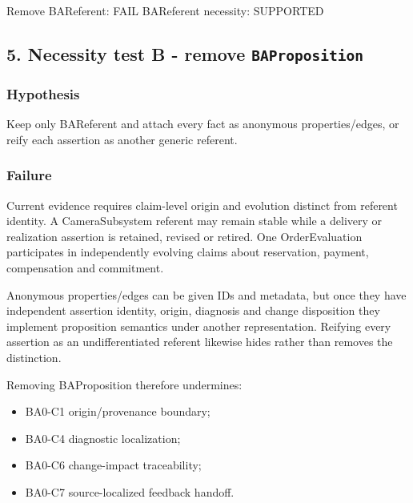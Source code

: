 \documentclass[
  10pt,
  a4paper,
]{article}
\newenvironment{Shaded}{}{}
\newcommand{\NormalTok}[1]{#1}
\providecommand{\tightlist}{%
  \setlength{\itemsep}{0pt}\setlength{\parskip}{0pt}}
\begin{document}
\begin{Shaded}
\begin{Highlighting}[]
\NormalTok{Remove BAReferent: FAIL}
\NormalTok{BAReferent necessity: SUPPORTED}
\end{Highlighting}
\end{Shaded}

\subsection{\texorpdfstring{5. Necessity test B - remove
\texttt{BAProposition}}{5. Necessity test B - remove BAProposition}}\label{necessity-test-b---remove-baproposition}

\subsubsection{Hypothesis}\label{hypothesis-1}

Keep only BAReferent and attach every fact as anonymous
properties/edges, or reify each assertion as another generic referent.

\subsubsection{Failure}\label{failure-1}

Current evidence requires claim-level origin and evolution distinct from
referent identity. A CameraSubsystem referent may remain stable while a
delivery or realization assertion is retained, revised or retired. One
OrderEvaluation participates in independently evolving claims about
reservation, payment, compensation and commitment.

Anonymous properties/edges can be given IDs and metadata, but once they
have independent assertion identity, origin, diagnosis and change
disposition they implement proposition semantics under another
representation. Reifying every assertion as an undifferentiated referent
likewise hides rather than removes the distinction.

Removing BAProposition therefore undermines:

\begin{itemize}
\tightlist
\item
  BA0-C1 origin/provenance boundary;
\item
  BA0-C4 diagnostic localization;
\item
  BA0-C6 change-impact traceability;
\item
  BA0-C7 source-localized feedback handoff.
\end{itemize}
\end{document}
